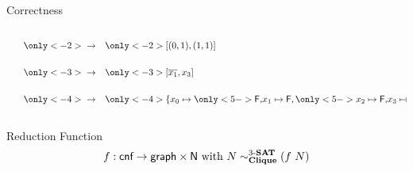 \documentclass[11pt,usenames,dvipsnames,
  hyperref={pdfencoding=auto,psdextra}]{beamer}
\newcommand{\colorTikzA}{red}
\begin{document}
\begin{frame}[t]{Correctness}
\begin{overlayarea}{\textwidth}{0.35\textwidth}
\begin{columns}
\begin{column}{0.48 \textwidth}
\begin{center}
        \end{center}
      \end{column}
      \begin{column}{0.48 \textwidth}
        \begin{align*}
          \only<-2>{\color{white}}\rightarrow \quad& \only<-2>{\color{white}} [(0, 1), (1, 1)] \\[3.3ex]
          \only<-3>{\color{white}} \rightarrow \quad& \only<-3>{\color{white}} [\overline{x_1}, x_3] \\[3.3ex]
          \only<-4> {\color{white}} \rightarrow \quad& \only<-4>{\color{white}} \{x_0 \mapsto {\only<5->{\color{gray}}\bfalse,} x_1 \mapsto {\bfalse}, {\only<5->{\color{gray}} x_2 \mapsto \bfalse,} x_3 \mapsto {\btrue}\}
        \end{align*}
      \end{column}
    \end{columns}
  \end{overlayarea}
\end{frame}

\begin{frame}{Reduction Function}
  \[f : \textsf{cnf} \rightarrow \textsf{graph} \times \mathsf{N} \text{ with } N \sim^{\text{3-\textbf{SAT}}}_{\textbf{Clique}} (f~N) \]
\end{frame}
\end{document}
